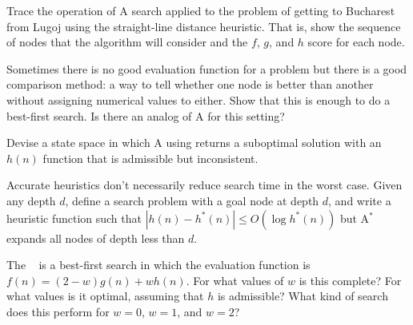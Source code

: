 \begin{exercise}
Trace the operation of A{\star} search applied to the problem of getting
to Bucharest from Lugoj using the straight-line distance heuristic.
That is, show the sequence of nodes that the algorithm will consider and
the \(f\), \(g\), and \(h\) score for each node.
\end{exercise} 

\begin{iexercise}
Sometimes there is no good evaluation function for a problem but there
is a good comparison method: a way to tell whether one node is better than
another without assigning numerical values to either.  Show that this
is enough to do a best-first search.  Is there an analog of A{\star} for this setting?
\end{iexercise} 

\begin{exercise}%
\prgex
Devise a state space in which A{\star} using 
returns a suboptimal solution with an \(h(n)\) function that is admissible
but inconsistent.
\end{exercise} 



\begin{iexercise}%
 Accurate heuristics don't necessarily reduce search time in the
 worst case.  Given any depth \(d\), define a search problem with a goal
 node at depth \(d\), and write a heuristic function such that \(|h(n) -
 h^*(n)| \le O(\log h^*(n))\) but A\(^*\) expands all nodes of depth less
 than \(d\).
\end{iexercise} 

\begin{exercise}%
The ~\cite{Pohl:1977} is a
best-first search in which the evaluation function is \(f(n) =
(2-w)g(n) + wh(n)\).  For what values of \(w\) is this complete?  For
what values is it optimal, assuming that \(h\) is admissible?  What
kind of search does this perform for \(w=0\), \(w=1\), and \(w=2\)?
\end{exercise} 

